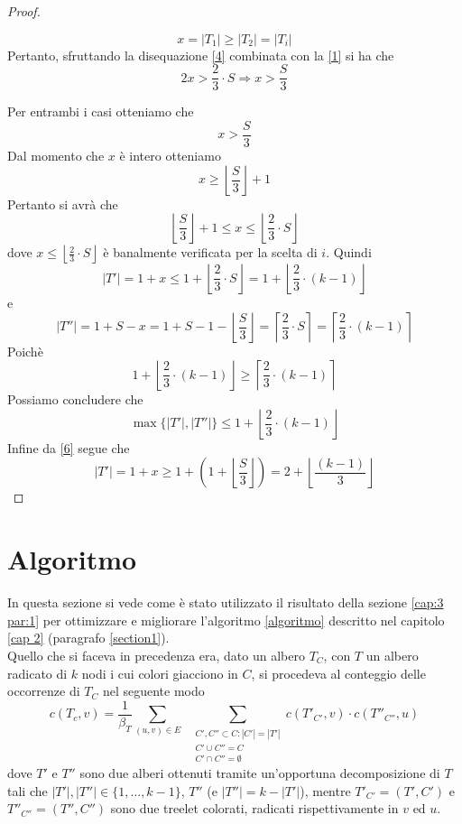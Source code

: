 \begin{proof}
\begin{itemize}
 	\begin{equation}\label{4}
 	x = |T_1| \ge |T_2| = |T_i|
 	\end{equation}
 	Pertanto, sfruttando la disequazione \eqref{4} combinata con la \eqref{1} si ha che
 	\begin{equation}\label{5}
 	2x > \frac{2}{3} \cdot S \Rightarrow x > \frac{S}{3}
 	\end{equation}
	\end{itemize}
Per entrambi i casi otteniamo che 
\[ x > \frac{S}{3} \]
Dal momento che $ x $ \`e intero otteniamo 
\[ x \ge \left\lfloor \frac{S}{3}\right\rfloor  + 1\]
Pertanto si avr\`a che 
\begin{equation}\label{6}
	\left\lfloor \frac{S}{3}\right\rfloor  + 1 \le x \le \left\lfloor \frac{2}{3}\cdot S \right\rfloor
\end{equation} 
dove $  x \le \left\lfloor \frac{2}{3}\cdot S \right\rfloor $ \`e banalmente verificata per la scelta di $ i $.
Quindi 
\begin{equation}\label{7}
|T'| = 1+x \le 1 + \left\lfloor \frac{2}{3}\cdot S \right\rfloor = 1 + \left\lfloor \frac{2}{3} \cdot (k-1) \right\rfloor	
\end{equation}
e
\begin{equation}\label{8}
|T''| = 1 + S - x = 1+S-1 - \left\lfloor \frac{S}{3}\right\rfloor = \left\lceil \frac{2}{3}\cdot S \right\rceil = \left\lceil \frac{2}{3} \cdot (k-1) \right\rceil 	
\end{equation}
Poich\`e
\[1 + \left\lfloor \frac{2}{3} \cdot (k-1) \right\rfloor \ge \left\lceil \frac{2}{3} \cdot (k-1) \right\rceil \] 
Possiamo concludere che
\[ \max\{|T'|,|T''|\} \le 1 + \left\lfloor \frac{2}{3} \cdot (k-1) \right\rfloor \]
Infine da \eqref{6} segue che
\[ 
|T'| = 1+ x \ge 1+ (1 +  \left\lfloor \frac{S}{3}\right\rfloor ) = 2 +  \left\lfloor \frac{(k-1)}{3}\right\rfloor
\]
\end{proof}
 
 	
\section{Algoritmo}
\label{cap:3 par:2}
In questa sezione si vede come \`e stato utilizzato il risultato della sezione \ref{cap:3 par:1} per ottimizzare e migliorare l'algoritmo \ref{algoritmo} descritto nel capitolo \ref{cap 2} (paragrafo \ref{section1}).\\
Quello che si faceva in precedenza era, dato un albero $ T_C $, con $ T $ un albero radicato di $ k $ nodi i cui colori giacciono in $ C $, si procedeva al conteggio delle occorrenze di $ T_C $ nel seguente modo
\[	
c(T_c,v)=\frac{1}{\beta_T}\sum_{(u,v)\in E} \;\; \sum_{\substack{C', C'' \subset C : |C'| = |T'| \\C' \cup C'' = C  \\ C' \cap C'' = \emptyset}}c(T'_{C'},v)\cdot c(T''_{C''},u) 
\]
dove  $T'$ e $T''$ sono due alberi ottenuti tramite un'opportuna decomposizione di $T$  tali che $|T'|, |T''| \in \{1, \dots, k-1\}$, $ T'' $ (e $|T''| = k - |T'|$), mentre $ T'_ {C'} = (T', C') $ e $ T''_{C''} = (T'', C'') $ sono due treelet colorati, radicati rispettivamente in $ v $ ed $ u $.

